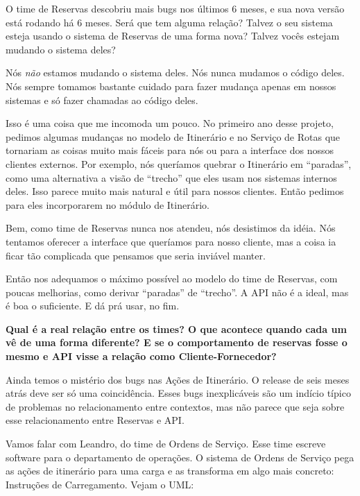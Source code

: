 \documentclass[12pt,play]{article}
\begin{document}
\narr {}
\scene
\serg O time de Reservas descobriu mais bugs nos últimos 6 meses, e sua nova versão está rodando há 6 meses. Será que tem alguma relação? Talvez o seu sistema esteja usando o sistema de Reservas de uma forma nova? Talvez vocês estejam mudando o sistema deles?

\cris {} Nós \emph{não} estamos mudando o sistema deles. Nós nunca mudamos o código deles. Nós sempre tomamos bastante cuidado para fazer mudança apenas em nossos sistemas e só fazer chamadas ao código deles.

Isso é uma coisa que me incomoda um pouco. No primeiro ano desse projeto, pedimos algumas mudanças no modelo de Itinerário e no Serviço de Rotas que tornariam as coisas muito mais fáceis para nós ou para a interface dos nossos clientes externos. Por exemplo, nós queríamos quebrar o Itinerário em ``paradas'', como uma alternativa a visão de ``trecho'' que eles usam nos sistemas internos deles. Isso parece muito mais natural e útil para nossos clientes. Então pedimos para eles incorporarem no módulo de Itinerário.

Bem, como time de Reservas nunca nos atendeu, nós desistimos da idéia. Nós tentamos oferecer a interface que queríamos para nosso cliente, mas a coisa ia ficar tão complicada que pensamos que seria inviável manter.

Então nos adequamos o máximo possível ao modelo do time de Reservas, com poucas melhorias, como derivar ``paradas'' de ``trecho''. A API não é a ideal, mas é boa o suficiente. E dá prá usar, no fim.

\narr \textbf{ Qual é a real relação entre os times? O que acontece quando cada um vê de uma forma diferente? E se o comportamento de reservas fosse o mesmo e API visse a relação como Cliente-Fornecedor?}


\narr Ainda temos o mistério dos bugs nas Ações de Itinerário. O release de seis meses atrás deve ser só uma coincidência. Esses bugs inexplicáveis são um indício típico de problemas no relacionamento entre contextos, mas não parece que seja sobre esse relacionamento entre Reservas e API.

\act
\narr Vamos falar com Leandro, do time de Ordens de Serviço. Esse time escreve software para o departamento de operações.
\narr {} O sistema de Ordens de Serviço pega as ações de itinerário para uma carga e as transforma em algo mais concreto: Instruções de Carregamento. Vejam o UML:
\end{document}
